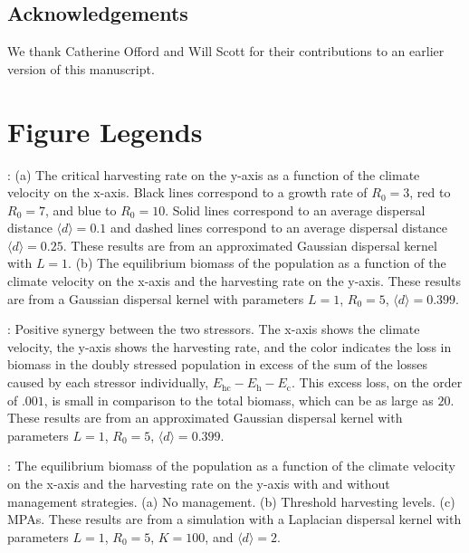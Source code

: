 \documentclass[12pt,english]{article}
\begin{document}
\begin{spacing}{1.9}
\begin{flushleft}
\section*{ Acknowledgements}
We thank Catherine Offord and Will Scott for their contributions to an earlier version of this manuscript. 

\end{flushleft}



\pagebreak

\section*{Figure Legends}

: (a) The critical harvesting rate on the y-axis as a function of the climate velocity on the x-axis.  Black lines correspond to a growth rate of $R_0=3$, red to $R_0=7$, and blue to $R_0=10$.  Solid lines correspond to an average dispersal distance $\langle d \rangle =0.1$ and dashed lines correspond to an average dispersal distance $\langle d \rangle =0.25$.  These results are from an approximated Gaussian dispersal kernel with $L=1$.  (b) 
The equilibrium biomass of the population as a function of the climate velocity on the x-axis and the harvesting rate on the y-axis. These results are from a Gaussian dispersal kernel with parameters $L=1$, $R_0=5$, $\langle d \rangle = 0.399$. 
\hspace{6in}
\hspace{6in}

: Positive synergy between the two stressors.  The x-axis shows the climate velocity, the y-axis shows the harvesting rate, and the color indicates the loss in biomass in the doubly stressed population in excess of the sum of the losses caused by each stressor individually, $E_\text{hc}-E_\text{h}-E_\text{c}$.  This excess loss, on the order of $.001$, is small in comparison to the total biomass, which can be as large as $20$.  These results are from an approximated Gaussian dispersal kernel with parameters $L=1$, $R_0=5$, $\langle d \rangle = 0.399$.
\hspace{6in}
\hspace{6in}

: The equilibrium biomass of the population as a function of the climate velocity on the x-axis and the harvesting rate on the y-axis with and without management strategies.  (a) No management.  (b) Threshold harvesting levels.  (c) MPAs.  These results are from a simulation with a Laplacian dispersal kernel with parameters $L=1$, $R_0=5$, $K=100$, and $\langle d \rangle =2$.
\pagebreak


\end{spacing}
\end{document}
